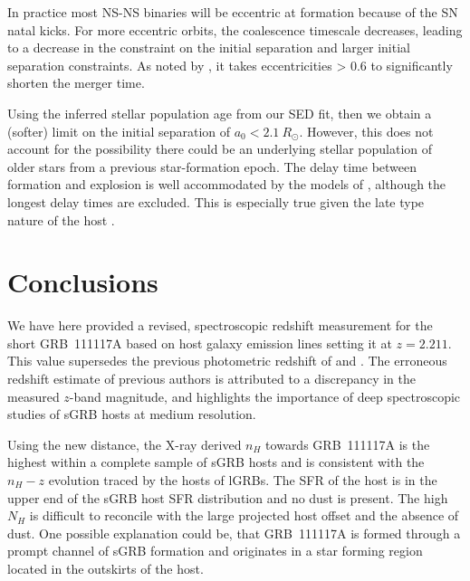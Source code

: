 \documentclass{aa}    %
\begin{document}
In practice most NS-NS binaries will be eccentric at formation because of the SN
natal kicks. For more eccentric orbits, the coalescence timescale decreases,
leading to a decrease in the constraint on the initial separation and larger
initial separation constraints. As noted by \citet{Postnov2014}, it takes
eccentricities > 0.6 to significantly shorten the merger time.

Using the inferred stellar population age from our SED fit, then we obtain a
(softer) limit on the initial separation of $a_0 < 2.1~R_\odot$. However, this
does not account for the possibility there could be an underlying stellar
population of older stars from a previous star-formation epoch. The delay time
between formation and explosion is well accommodated by the models of
\citet{Belczynski2006}, although the longest delay times are excluded.
This is especially true given the late type nature of the host
\citep{OShaughnessy2008}.

\section{Conclusions}

We have here provided a revised, spectroscopic redshift measurement for the
short GRB~111117A based on host galaxy emission lines setting it at $z = 2.211$.
This value supersedes the previous photometric redshift of \citet{Margutti2012}
and \citet{Sakamoto2013}. The erroneous redshift estimate of previous authors is
attributed to a discrepancy in the measured $z$-band magnitude, and highlights
the importance of deep spectroscopic studies of sGRB hosts at medium resolution.

Using the new distance, the X-ray derived $n_H$ towards GRB~111117A is the
highest within a complete sample of sGRB hosts and is consistent with the
$n_H-z$ evolution traced by the hosts of lGRBs. The SFR of the host is in the
upper end of the sGRB host SFR distribution and no dust is present. The high
$N_H$ is difficult to reconcile with the large projected host offset and the
absence of dust. One possible explanation could be, that GRB~111117A is formed
through a prompt channel of sGRB formation and originates in a star forming
region located in the outskirts of the host.
\end{document}
